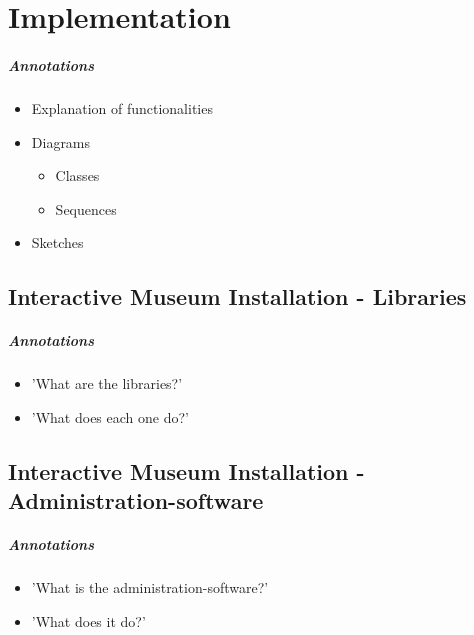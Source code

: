 \chapter{Implementation}
\label{implementation}

\paragraph{Annotations}

\begin{itemize}
	\item Explanation of functionalities
	\item Diagrams
	\begin{itemize}
		\item Classes
		\item Sequences
	\end{itemize}
	\item Sketches
\end{itemize}



\section{Interactive Museum Installation - Libraries}
\label{implementation_libraries}

\paragraph{Annotations}

\begin{itemize}
	\item 'What are the libraries?'
	\item 'What does each one do?'
\end{itemize}



\section{Interactive Museum Installation - Administration-software}
\label{implementation_administration}

\paragraph{Annotations}

\begin{itemize}
	\item 'What is the administration-software?'
	\item 'What does it do?'
\end{itemize}



